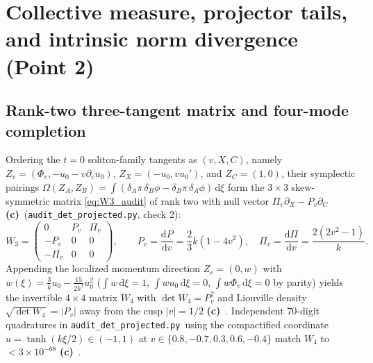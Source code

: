 \documentclass[11pt,a4paper]{article}
\newcommand{\Lc}{\textsf{\textbf{(c)}}\ }
\newcommand{\scr}{\texttt{audit\_\allowbreak det\_\allowbreak projected.py}}
\newcommand{\dd}{\mathrm d}
\begin{document}
\section{Collective measure, projector tails, and intrinsic norm divergence (Point 2)}
\subsection{Rank-two three-tangent matrix and four-mode completion}
Ordering the $t=0$ soliton-family tangents as $(v,X,C)$, namely
$Z_v=(\Phi_v,-u_0-v\partial_v u_0)$, $Z_X=(-u_0,v u_0')$, and $Z_C=(1,0)$,
their symplectic pairings $\Omega(Z_A,Z_B)=\int(\delta_A\pi\,\delta_B\phi-\delta_B\pi\,\delta_A\phi)\,\dd\xi$
form the $3\times3$ skew-symmetric matrix \eqref{eq:W3_audit} of rank two with
null vector $\Pi_v\partial_X-P_v\partial_C$ \Lc (\scr, check 2):
\begin{equation}\label{eq:W3_audit}
 W_3=\begin{pmatrix}0&P_v&\Pi_v\\-P_v&0&0\\-\Pi_v&0&0\end{pmatrix},\qquad
 P_v=\frac{\dd P}{\dd v}=\frac23k(1-4v^2),\quad
 \Pi_v=\frac{\dd\Pi}{\dd v}=\frac{2(2v^2-1)}{k}.
\end{equation}
Appending the localized momentum direction $Z_r=(0,w)$ with
$w(\xi)=\tfrac3k u_0-\tfrac{15}{2k^3}u_0^2$ ($\int w\,\dd\xi=1$,
$\int wu_0\,\dd\xi=0$, $\int w\Phi_v\,\dd\xi=0$ by parity) yields the invertible
$4\times4$ matrix $W_4$ with $\det W_4=P_v^2$ and Liouville density
$\sqrt{\det W_4}=|P_v|$ away from the cusp $|v|=1/2$ \Lc. Independent 70-digit
quadratures in \scr\ using the compactified coordinate $u=\tanh(k\xi/2)\in(-1,1)$
at $v\in\{0.8,-0.7,0.3,0.6,-0.4\}$ match $W_4$ to $<3\times10^{-68}$ \Lc.
\end{document}
